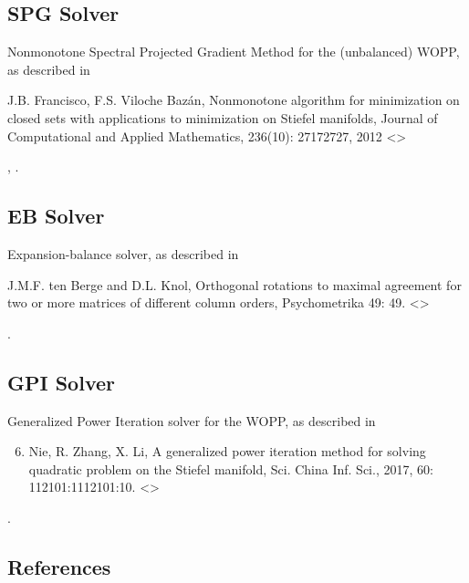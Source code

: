 \documentclass[a4paper,10pt,english]{sphinxmanual}
\begin{document}
\subsection{SPG Solver}
\label{\detokenize{solvers:spg}}\label{\detokenize{solvers:spg-solver}}
Nonmonotone Spectral Projected Gradient Method for the (unbalanced) WOPP, as described in %
\begin{footnote}[1]\sphinxAtStartFootnote
J.B. Francisco, F.S. Viloche Bazán, Nonmonotone algorithm for minimization on closed sets with applications to minimization on Stiefel manifolds, Journal of Computational and Applied Mathematics, 236(10): 2717\textendash{}2727, 2012 \textless{}\textgreater{}
%
\end{footnote}, \sphinxfootnotemark[2].


\subsection{EB Solver}
\label{\detokenize{solvers:eb}}\label{\detokenize{solvers:eb-solver}}
Expansion-balance solver, as described in %
\begin{footnote}[3]\sphinxAtStartFootnote
J.M.F. ten Berge and D.L. Knol, Orthogonal rotations to maximal agreement for two or more matrices of different column orders, Psychometrika 49: 49. \textless{}\textgreater{}
%
\end{footnote}.


\subsection{GPI Solver}
\label{\detokenize{solvers:gpi}}\label{\detokenize{solvers:gpi-solver}}
Generalized Power Iteration solver for the WOPP, as described in %
\begin{footnote}[5]\sphinxAtStartFootnote
\begin{enumerate}
\setcounter{enumi}{5}
\item {} 
Nie, R. Zhang, X. Li, A generalized power iteration method for solving quadratic problem on the Stiefel manifold, Sci. China Inf. Sci., 2017, 60: 112101:1\textendash{}112101:10. \textless{}\textgreater{}

\end{enumerate}
%
\end{footnote}.


\subsection{References}
\label{\detokenize{solvers:references}}
\end{document}
